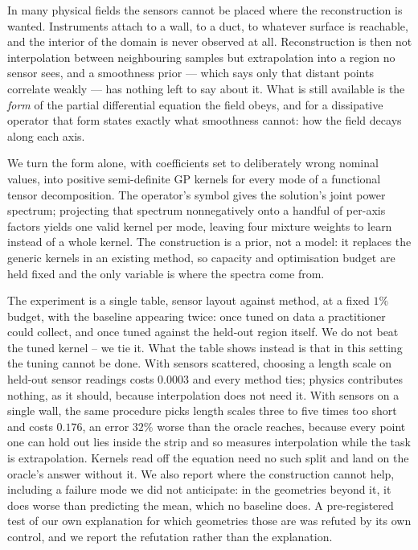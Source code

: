 In many physical fields the sensors cannot be placed where the reconstruction is
wanted.  Instruments attach to a wall, to a duct, to whatever surface is
reachable, and the interior of the domain is never observed at all.
Reconstruction is then not interpolation between neighbouring samples but
extrapolation into a region no sensor sees, and a smoothness prior --- which
says only that distant points correlate weakly --- has nothing left to say about
it.  What is still available is the \emph{form} of the partial differential
equation the field obeys, and for a dissipative operator that form states
exactly what smoothness cannot: how the field decays along each axis.

We turn the form alone, with coefficients set to deliberately wrong nominal
values, into positive semi-definite GP kernels for every mode of a functional
tensor decomposition.  The operator's symbol gives the solution's joint power
spectrum; projecting that spectrum nonnegatively onto a handful of per-axis
factors yields one valid kernel per mode, leaving four mixture weights to learn
instead of a whole kernel.  The construction is a prior, not a model: it replaces
the generic kernels in an existing method, so capacity and optimisation budget
are held fixed and the only variable is where the spectra come from.

The experiment is a single table, sensor layout against method, at a fixed $1\%$
budget, with the baseline appearing twice: once tuned on data a practitioner
could collect, and once tuned against the held-out region itself.  We do not
beat the tuned kernel -- we tie it.  What the table shows instead is that in
this setting the tuning cannot be done.  With sensors scattered, choosing a
length scale on held-out sensor readings costs $0.0003$ and every method ties;
physics contributes nothing, as it should, because interpolation does not need
it.  With sensors on a single wall, the same procedure picks length scales three
to five times too short and costs $0.176$, an error $32\%$ worse than the oracle
reaches, because every point one can hold out lies inside the strip and so
measures interpolation while the task is extrapolation.  Kernels read off the
equation need no such split and land on the oracle's answer without it.  We also report where the construction cannot help, including a failure mode we
did not anticipate: in the geometries beyond it, it does worse than predicting
the mean, which no baseline does.  A pre-registered test of our own explanation
for which geometries those are was refuted by its own control, and we report the
refutation rather than the explanation.
